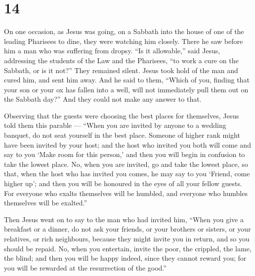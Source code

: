 \hypertarget{section-12}{%
\section{14}\label{section-12}}

 On one occasion, as Jesus was going, on a Sabbath into the
house of one of the leading Pharisees to dine, they were watching him
closely.  There he saw before him a man who was suffering
from dropsy.  ``Is it allowable,'' said Jesus, addressing
the students of the Law and the Pharisees, ``to work a cure on the
Sabbath, or is it not?''  They remained silent. Jesus took
hold of the man and cured him, and sent him away.  And he
said to them, ``Which of you, finding that your son or your ox has
fallen into a well, will not immediately pull them out on the Sabbath
day?''  And they could not make any answer to that.

 Observing that the guests were choosing the best places for
themselves, Jesus told them this parable ---  ``When you are
invited by anyone to a wedding banquet, do not seat yourself in the best
place. Someone of higher rank might have been invited by your host;
 and the host who invited you both will come and say to you
`Make room for this person,' and then you will begin in confusion to
take the lowest place.  No, when you are invited, go and
take the lowest place, so that, when the host who has invited you comes,
he may say to you `Friend, come higher up'; and then you will be
honoured in the eyes of all your fellow guests.  For
everyone who exalts themselves will be humbled, and everyone who humbles
themselves will be exalted.''

 Then Jesus went on to say to the man who had invited him,
``When you give a breakfast or a dinner, do not ask your friends, or
your brothers or sisters, or your relatives, or rich neighbours, because
they might invite you in return, and so you should be repaid.
 No, when you entertain, invite the poor, the crippled, the
lame, the blind;  and then you will be happy indeed, since
they cannot reward you; for you will be rewarded at the resurrection of
the good.''

